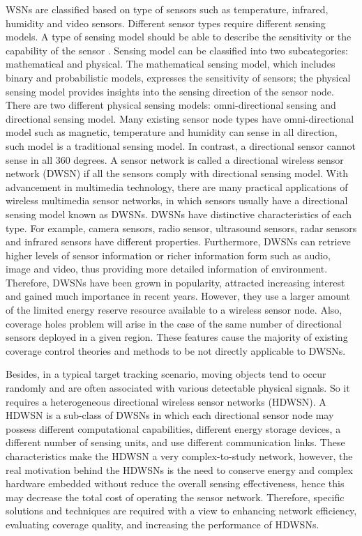 \documentclass[final]{elsarticle}
\begin{document}
WSNs are classified based on type of sensors such as temperature, infrared, humidity and video sensors. Different sensor types require different sensing models. A type of sensing model should be able to describe the sensitivity or the capability of the sensor \cite{b10}. Sensing model can be classified into two subcategories: mathematical and physical. The mathematical sensing model, which includes binary and probabilistic models, expresses the sensitivity of sensors; the physical sensing model provides insights into the sensing direction of the sensor node. There are two different physical sensing models: omni-directional sensing and directional sensing model. Many existing sensor node types have omni-directional model such as magnetic, temperature and humidity can sense in all direction, such model is a traditional sensing model. In contrast, a directional sensor cannot sense in all 360 degrees. A sensor network is called a directional wireless sensor network (DWSN) if all the sensors comply with directional sensing model. With advancement in multimedia technology, there are many practical applications of wireless multimedia sensor networks, in which sensors usually have a directional sensing model known as DWSNs. DWSNs have distinctive characteristics of each type. For example, camera sensors, radio sensor, ultrasound sensors, radar sensors and infrared sensors have different properties. Furthermore, DWSNs can retrieve higher levels of sensor information or richer information form such as audio, image and video, thus providing more detailed information of environment. Therefore, DWSNs have been grown in popularity, attracted increasing interest and gained much importance in recent years. However, they use a larger amount of the limited energy reserve resource available to a wireless sensor node. Also, coverage holes problem will arise in the case of the same number of directional sensors deployed in a given region. These features cause the majority of existing coverage control theories and methods to be not directly applicable to DWSNs. 

Besides, in a typical target tracking scenario, moving objects tend to occur randomly and are often associated with various detectable physical signals.
So it requires a heterogeneous directional wireless sensor networks (HDWSN). A HDWSN is a sub-class of DWSNs in which each directional sensor node may possess different computational capabilities, different energy storage devices, a different number of sensing units, and use different communication links. These characteristics make the HDWSN a very complex-to-study network, however, the real motivation behind the HDWSNs is the need to conserve energy and complex hardware embedded without reduce the overall sensing effectiveness, hence this may decrease the total cost of operating the sensor network. Therefore, specific solutions and techniques are required with a view to enhancing network efficiency, evaluating coverage quality, and increasing the performance of HDWSNs. 
\end{document}
